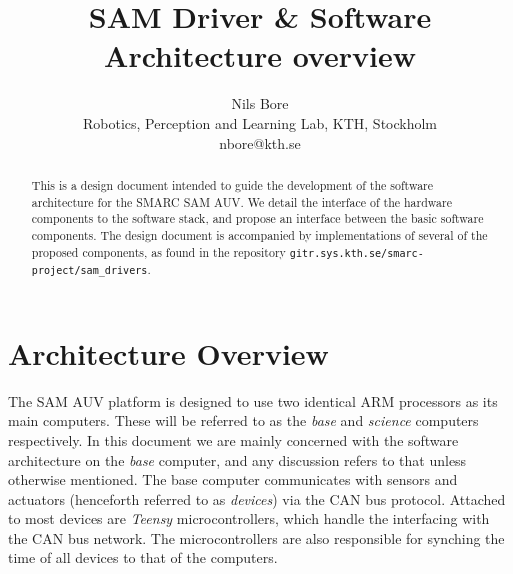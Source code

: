 \documentclass[9pt,technote]{IEEEtran} %
\begin{document}

\title{SAM Driver \& Software Architecture overview}%
\author{Nils Bore\\ %
Robotics, Perception and Learning Lab, KTH, Stockholm\\
nbore@kth.se} %

\maketitle

\begin{abstract}
This is a design document intended to guide the development
of the software architecture for the SMARC SAM AUV.
We detail the interface of the hardware components to the
software stack, and propose an interface between
the basic software components. The design document
is accompanied by implementations of several of the
proposed components, as found in the repository
\texttt{gitr.sys.kth.se/smarc-project/sam\_drivers}.
\end{abstract}


\section{Architecture Overview}
\label{overview}

The SAM AUV platform is designed to use two identical ARM processors as its main computers.
These will be referred to as the \textit{base} and \textit{science} computers respectively.
In this document we are mainly concerned with the software architecture on the \textit{base}
computer, and any discussion refers to that unless otherwise mentioned.
The base computer communicates with sensors and actuators (henceforth referred to as \textit{devices})
via the CAN bus protocol. Attached to most devices are \textit{Teensy} microcontrollers, which
handle the interfacing with the CAN bus network. The microcontrollers are also responsible for
synching the time of all devices to that of the computers.
\end{document}

